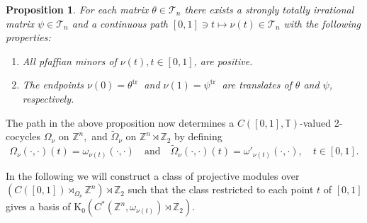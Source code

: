 \documentclass[9pt, BCOR=2mm]{amsart}
\numberwithin{equation}{section}
\numberwithin{equation}{section}
\newtheorem{proposition}[theorem]{Proposition}
\newcommand{\Z}{{\mathbb{Z}}}
\newcommand{\K}{\mathrm{K}} %
\begin{document}
\begin{proposition}\label{prp:path_positive_pfaffian}
	For each matrix $\theta \in \mathcal{T}_n$ there exists a strongly totally irrational matrix $\psi \in \mathcal{T}_n$ and a continuous path $[0,1] \ni t \mapsto \nu(t) \in \mathcal{T}_n$ with the following properties:
	\begin{enumerate}[label=(\alph*)]
		\item All pfaffian minors of $\nu(t), t \in[0,1]$, are positive.
		\item The endpoints $\nu(0)=\theta^{\text {tr }}$ and $\nu(1)=\psi^{\text {tr }}$ are translates of $\theta$ and $\psi$, respectively.
	\end{enumerate}
\end{proposition}
\noindent The path in the above proposition now determines a $C([0,1], \mathbb{T})$-valued 2-cocycles $\Omega_\nu$ on $\mathbb{Z}^n,$ and $\widetilde{\Omega}_\nu$ on $\mathbb{Z}^n\rtimes \Z_2$ by defining
$$
\Omega_\nu(\cdot, \cdot)(t)=\omega_{\nu(t)}(\cdot, \cdot)\quad \text{and}\quad \widetilde{\Omega}_{\nu}(\cdot, \cdot)(t)=\omega'_{\nu(t)}(\cdot, \cdot), \quad t \in[0,1].
$$





	  
	 
	 
	 
	 
	 In the following we will construct a class of projective modules over $(C([0,1])\rtimes_{ \Omega_{\nu}} \Z^n)\rtimes \Z_2$ such that the class restricted to each point $t$ of $[0,1]$ gives a basis of $\K_0(C^*(\Z^n,\omega_{{\nu}(t)})\rtimes \Z_2).$ 

  
  
\end{document}
